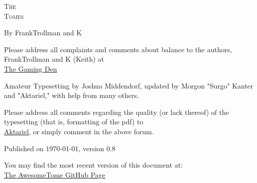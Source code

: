\pagestyle{plain}

\begin{center} \Huge

\textsc{The\\
Tomes\\
}\end{center}

\vspace{2cm}
\begin{center}\large By FrankTrollman and K\end{center}

\newpage

\vspace*{4in}

\noindent Please address all complaints and comments about balance to the authors, FrankTrollman and K (Keith) at\\
\href{http://tgdmb.com/viewforum.php?f=1}{The Gaming Den}

\vspace{0.2in}



\noindent Amateur Typesetting by Joshua Middendorf, updated by Morgon "Surgo" Kanter and "Aktariel," with help from many others.\\

\vspace{0.2in}

\noindent Please address all comments regarding the quality (or lack thereof) of the typesetting (that is, formatting of the pdf) to\\
\href{mailto:aktariel@gmail.com}{Aktariel}, or simply comment in the above forum.\\





\vspace{1in}

\noindent Published on \today, version 0.8\\
\vspace{0.1in}

\noindent You may find the most recent version of this document at:\\
\href{https://github.com/ideologysec/awesometome}{The AwesomeTome GitHub Page}

\newpage
